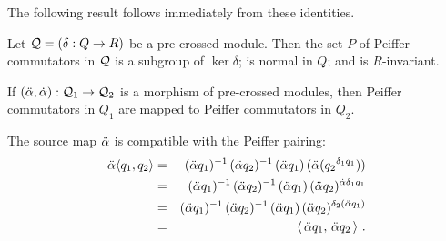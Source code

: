 The following result follows immediately from these identities.

\begin{cor}
Let  $\mathcal{Q} = (\delta : Q \to R)$  be a pre-crossed module.
Then the set  $P$  of Peiffer commutators in $\mathcal{Q}$
is a subgroup of  $\ker \delta$;
is normal in  $Q$;  and is  $R$-invariant.
\end{cor}

\begin{prop}
If  $(\ddot{\alpha},\dot{\alpha}) : \mathcal{Q}_1 \to \mathcal{Q}_2$  is a morphism of pre-crossed modules,
then Peiffer commutators in $Q_1$  are mapped to Peiffer commutators
in $Q_2$.
\end{prop}
\begin{pf}
The source map  $\ddot{\alpha}$  is compatible with the Peiffer pairing:
\begin{eqnarray*}
\ddot{\alpha} \langle q_1, q_2 \rangle & = &
(\ddot{\alpha} q_1)^{-1}\,(\ddot{\alpha} q_2)^{-1}\,(\ddot{\alpha} q_1)\,(\ddot{\alpha}({q_2}^{\delta_1q_1})) \\
 & = &
(\ddot{\alpha} q_1)^{-1}\,(\ddot{\alpha} q_2)^{-1}\,(\ddot{\alpha} q_1)\,(\ddot{\alpha} q_2)^{\dot{\alpha}\delta_1q_1} \\
 & = &
(\ddot{\alpha} q_1)^{-1}\,(\ddot{\alpha} q_2)^{-1}\,(\ddot{\alpha} q_1)\,(\ddot{\alpha} q_2)^{\delta_2(\ddot{\alpha} q_1)}\\
 & = &
\langle\,\ddot{\alpha} q_1,\,\ddot{\alpha} q_2\,\rangle~.
\end{eqnarray*}
\end{pf}

